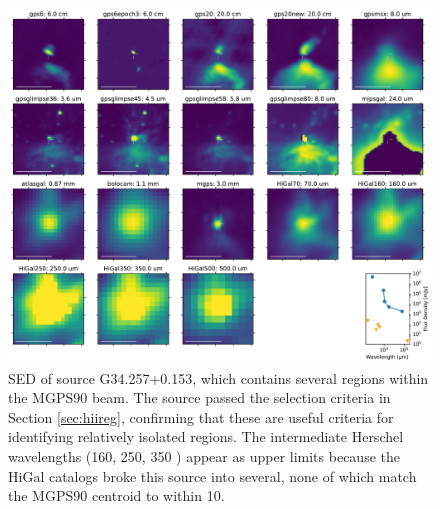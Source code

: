 \documentclass[twocolumn]{aastex62}
\begin{document}
\begin{figure}[htp]
\includegraphics[width=17cm]{figures/SED_plot_G34_G34.257+0.153.pdf}
\caption{SED of source G34.257+0.153, which contains several \hchii regions
within the MGPS90 beam.  The source passed the selection criteria in Section
\ref{sec:hiireg}, confirming that these are useful criteria for identifying
relatively isolated \hchii regions. The intermediate Herschel wavelengths (160,
250, 350 \um) appear as upper limits because the HiGal catalogs broke this
source into several, none of which match the MGPS90 centroid to within
10\arcsec.}
\label{fig:g34hchii}
\end{figure}








\end{document}
